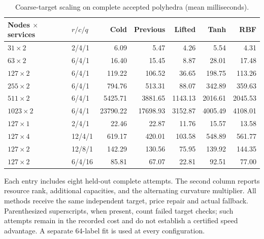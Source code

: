 \begin{table}[tbp]\centering\small
\caption{Coarse-target scaling on complete accepted polyhedra (mean milliseconds).}\label{tab:r22-scaling-coarse}
\begin{tabular}{llrrrrr}
\toprule
Nodes $\times$ services & $r/c/q$ & Cold & Previous & Lifted & Tanh & RBF\\
\midrule
$31\times 2$ & 2/4/1 & 6.09 & 5.47 & 4.26 & 5.54 & 4.31\\
$63\times 2$ & 6/4/1 & 16.40 & 15.45 & 8.87 & 28.01 & 17.48\\
$127\times 2$ & 6/4/1 & 119.22 & 106.52 & 36.65 & 198.75 & 113.26\\
$255\times 2$ & 6/4/1 & 794.76 & 513.31 & 88.07 & 342.89 & 359.63\\
$511\times 2$ & 6/4/1 & 5425.71 & 3881.65 & 1143.13 & 2016.61 & 2045.53\\
$1023\times 2$ & 6/4/1 & 23790.22 & 17698.93 & 3152.87 & 4005.49 & 4108.01\\
$127\times 1$ & 2/4/1 & 22.46 & 22.87 & 11.76 & 15.57 & 13.58\\
$127\times 4$ & 12/4/1 & 619.17 & 420.01 & 103.58 & 548.89 & 561.77\\
$127\times 2$ & 12/8/1 & 142.29 & 130.56 & 75.95 & 139.92 & 144.35\\
$127\times 2$ & 6/4/16 & 85.81 & 67.07 & 22.81 & 92.51 & 77.00\\
\bottomrule
\end{tabular}
\par\smallskip\begin{minipage}{.98\textwidth}\small Each entry includes eight held-out complete attempts. The second column reports resource rank, additional capacities, and the alternating curvature multiplier. All methods receive the same independent target, price repair and actual fallback. Parenthesized superscripts, when present, count failed target checks; such attempts remain in the recorded cost and do not establish a certified speed advantage. A separate 64-label fit is used at every configuration.\end{minipage}
\end{table}
